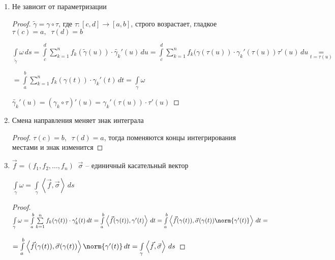 \begin{properties}\thmslashn
	
	\begin{enumerate}[1.]
		\item 
		Не зависит от параметризации
		
		\begin{proof}\thmslashn
			
			$\tilde{\gamma} = \gamma \circ \tau$, где $\tau: [c, d] \to [a, b]$, строго возрастает, гладкое $\tau(c) = a, \;\;\tau(d) = b$
			
			$\int\limits_{\tilde{\gamma}} \omega \,ds = \int\limits_{c}^{d} 
			\sum\limits_{k=1}^n f_k(\tilde{\gamma}(u)) \cdot \tilde{\gamma_k}'(u)\,du = \int\limits_{c}^{d} 
			\sum\limits_{k=1}^n f_k(\gamma(\tau(u)) \cdot \gamma_k'(\tau(u))\tau'(u)\,du \underset{t = \tau(u)}=$
			
			$= \int\limits_a^b \sum\limits_{k=1}^n f_k(\gamma(t)) \cdot \gamma_k'(t)\,dt = \int\limits_\gamma \omega$
			
			$\tilde{\gamma_k}'(u) = (\gamma_k\circ \tau)'(u) = \gamma_k'(\tau(u))\cdot \tau'(u)$	
			
		\end{proof}
		
		\item
		Смена направления меняет знак интеграла 
		
		\begin{proof}\thmslashn
			
			$\tau(c) = b,\;\; \tau(d) = a$, тогда поменяются концы интегрирования местами и знак изменится
			
		\end{proof}
		
		\item
		$\vec{f} = (f_1, f_2, \ldots, f_n)\;\; \vec{\sigma}$ -- единичный касательный вектор
		
		$\int\limits_{\gamma} \omega = \int\limits_{\gamma} \left\langle \vec{f}, \vec{\sigma} \right\rangle\,ds $
		
		\begin{proof}\thmslashn
			
			$ \int\limits_{\gamma} \omega = \int\limits_a^b \sum\limits_{k=1}^n f_k(\gamma(t)) \cdot \gamma_k'(t)\,dt = \int\limits_a^b \left\langle \vec{f}(\gamma(t)), \gamma'(t) \right\rangle\,dt = \int\limits_a^b \left\langle \vec{f}(\gamma(t)), \vec{\sigma}(\gamma(t)) \norm{\gamma'(t)} \right\rangle\,dt =$
			
			$= \int\limits_a^b \left\langle \vec{f}(\gamma(t)), \vec{\sigma}(\gamma(t)) \right\rangle \norm{\gamma'(t)}\,dt = \int\limits_{\gamma} \left\langle \vec{f}, \vec{\sigma} \right\rangle\,ds$
			

\end{proof}
\end{enumerate}
\end{properties}
